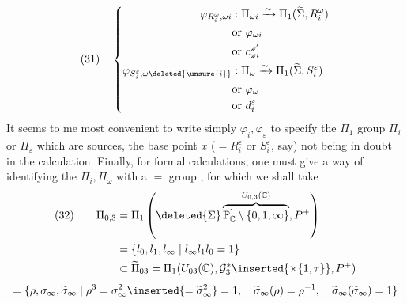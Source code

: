 \[
(31)\quad\left\{\begin{aligned}
\varphi_{R_i^\omega,\omega i}&:\Pi_{\omega i}\xrightarrow{\sim}\Pi_1(\widetilde\Sigma,R_i^\omega)\\
&\text{or }\varphi_{\omega i}\\
&\text{or }c_{\omega i}^{\omega'}\\
\varphi_{S_i^\varepsilon,\omega\deleted{\unsure{i}}}&:\Pi_\omega\xrightarrow{\sim}\Pi_1(\widetilde\Sigma,S_i^\varepsilon)\\
&\text{or }\varphi_\omega\\
&\text{or }d_i^{\varepsilon}
\end{aligned}\right.
\]
It seems to me most convenient to write simply $\varphi_i,\varphi_\varepsilon$ to specify the  $\Pi_1$ group $\Pi_i$ or $\Pi_\varepsilon$ which are sources, the base point $x$ ($=R_i^\varepsilon$ or $S_i^\varepsilon$, say) not being in doubt in the calculation.
Finally, for formal calculations, one must give a way of identifying the $\Pi_i,\Pi_\omega$ with a $=$  group , for which we shall take
\[
\begin{aligned}
(32)\qquad\Pi_{0,3}&=\Pi_1\left(\deleted{\Sigma}\overbrace{\mathbb P^1_{\mathbb C}\setminus\{0,1,\infty\}}^{U_{0,3}(\mathbb C)},P^+\right)\\
&=\{l_0,l_1,l_\infty\mid l_\infty l_1l_0=1\}\\
&\subset\widetilde\Pi_{03}=\Pi_1(U_{03}(\mathbb C),\mathcal G_3^*\inserted{\times\{1,\tau\}},P^+)
\end{aligned}
\]
\[
=\{\rho,\sigma_\infty,\widetilde\sigma_\infty\mid \rho^3=\sigma_\infty^2\inserted{=\widetilde\sigma_\infty^2}=1,\quad \widetilde\sigma_\infty(\rho)=\rho^{-1},\quad\widetilde\sigma_\infty(\widetilde\sigma_\infty)=1\}
\]
